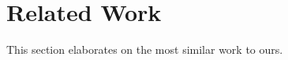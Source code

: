 \documentclass[conference]{IEEEtran}
\begin{document}


\section{Related Work}


This section elaborates on the most similar work to ours.


\end{document}
